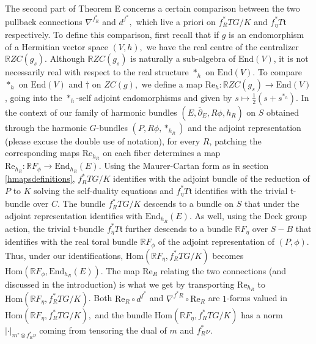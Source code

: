 \documentclass[10pt]{amsart}
\newcommand{\R}{\mathbb R}
\theoremstyle{definition}
\begin{document}
The second part of Theorem E concerns a certain comparison between the two pullback connections $\nabla^{f_R^*}$ and $d^{f^*},$ which live a priori on $f_R^*TG/K$ and $f_\eta^*T\mathfrak{t}$ respectively. To define this comparison, first recall that if $g$ is an endomorphism of a Hermitian vector space $(V,h),$ we have the real centre of the centralizer $\R ZC(g_s)$. Although $\R ZC(g_s)$ is naturally a sub-algebra of $\textrm{End}(V)$, it is not necessarily real with respect to the real structure $*_h$ on $\textrm{End}(V)$. To compare $*_h$ on $\textrm{End}(V)$  and $\dagger$ on $ZC(g),$ we define a map $\textrm{Re}_h: \R ZC(g_s)\to \textrm{End}(V)$, going into the $*_h$-self adjoint endomorphisms and given by $s\mapsto \frac{1}{2}(s+s^{*_h}).$ In the context of our family of harmonic bundles $(E,\overline{\partial}_E,R\phi,h_R)$ on $S$ obtained through the harmonic $G$-bundles $(P,R\phi,*_{h_R})$ and the adjoint representation (please excuse the double use of notation), for every $R$, patching the corresponding maps $\textrm{Re}_{h_R}$ on each fiber determines a map $\textrm{Re}_{h_R}: \R F_\phi\to \textrm{End}_{h_R}(E)$. 
Using the Maurer-Cartan form as in section \ref{hmapsdefinitions}, $f_R^*TG/K$ identifies with the adjoint bundle of the reduction of $P$ to $K$ solving the self-duality equations and $f_\eta^*T\mathfrak{t}$ identifies with the trivial $\mathfrak{t}$-bundle over $C$. 
The bundle $f_R^*TG/K$ descends to a bundle on $S$ that under the adjoint representation identifies with $\textrm{End}_{h_R}(E).$ As well,
using the Deck group action, the trivial $\mathfrak{t}$-bundle $f_\eta^*T\mathfrak{t}$ further descends to a bundle $\R F_\eta$ over $S-B$ that identifies with the real toral bundle $\R F_\phi$ of the adjoint representation of $(P,\phi).$  Thus, under our identifications, $\textrm{Hom}(\R F_\eta,f_R^*TG/K)$ becomes $\textrm{Hom}(\R F_\phi,\textrm{End}_{h_R}(E))$. The map $\textrm{Re}_R$ relating the two connections (and discussed in the introduction) is what we get by transporting $\textrm{Re}_{h_R}$ to $\textrm{Hom}(\R F_\eta,f_R^*TG/K)$.  Both $\textrm{Re}_R \circ d^{f^*}$ and $\nabla^{f^*R}\circ \textrm{Re}_R$ are $1$-forms valued in $\textrm{Hom}(\R F_\eta,f_R^*TG/K),$ and the bundle $\textrm{Hom}(\R F_\eta,f_R^*TG/K)$ has a norm $|\cdot|_{m^*\otimes f_R^*\nu}$ coming from tensoring the dual of $m$ and $f_R^*\nu.$
\end{document}

